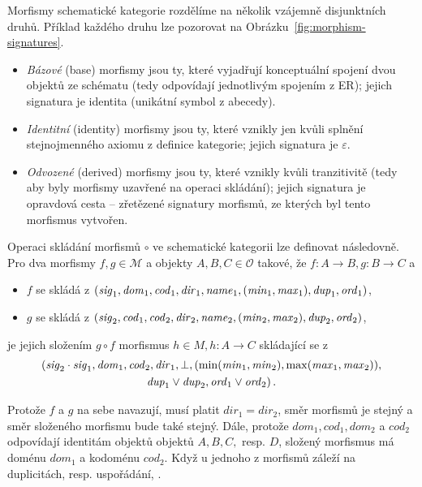 Morfismy schematické kategorie rozdělíme na několik vzájemně disjunktních druhů.
Příklad každého druhu lze pozorovat na Obrázku~\ref{fig:morphism-signatures}.
\begin{itemize}
  \item \emph{Bázové} (base) morfismy jsou ty, které vyjadřují konceptuální spojení dvou objektů ze schématu (tedy odpovídají jednotlivým spojením z ER); jejich signatura je identita (unikátní symbol z abecedy).
  \item \emph{Identitní} (identity) morfismy jsou ty, které vznikly jen kvůli splnění stejnojmenného axiomu z definice kategorie; jejich signatura je $\varepsilon$.
  \item \emph{Odvozené} (derived) morfismy jsou ty, které vznikly kvůli tranzitivitě (tedy aby byly morfismy uzavřené na operaci skládání); jejich signatura je opravdová cesta -- zřetězené signatury morfismů, ze kterých byl tento morfismus vytvořen.
\end{itemize}

Operaci skládání morfismů $\circ$ ve schematické kategorii lze definovat následovně.
Pro dva morfismy $f,g\in\mathcal M$ a objekty $A,B,C\in \mathcal O$ takové, že $f\colon A\to B, g\colon B\to C$ a
\begin{itemize}
  \item $f$ se skládá z $(\mathit{sig}_1, \mathit{dom}_1, \mathit{cod}_1, \mathit{dir}_1, \mathit{name}_1, (\mathit{min}_1, \mathit{max}_1), \mathit{dup}_1, \mathit{ord}_1)$,
  \item $g$ se skládá z $(\mathit{sig}_2, \mathit{cod}_1, \mathit{cod}_2, \mathit{dir}_2, \mathit{name}_2, (\mathit{min}_2, \mathit{max}_2), \mathit{dup}_2, \mathit{ord}_2)$,
\end{itemize}
je jejich složením $g\circ f$ morfismus $h\in M, h\colon A\to C$ skládající se z
\begin{multline*}
  (\mathit{sig}_2\cdot \mathit{sig}_1, \mathit{dom}_1, \mathit{cod}_2, \mathit{dir}_1, \bot, (\min(\mathit{min}_1, \mathit{min}_2), \max(\mathit{max}_1, \mathit{max}_2)),\\ 
  \mathit{dup}_1 \lor \mathit{dup}_2, \mathit{ord}_1\lor \mathit{ord}_2)\,.
\end{multline*}

Protože $f$ a $g$ na sebe navazují, musí platit $dir_1=dir_2$, směr morfismů je stejný a směr složeného morfismu bude také stejný.
Dále, protože $dom_1, cod_1, dom_2$ a $cod_2$ odpovídají identitám objektů objektů $A, B, C,$ resp. $D$, složený morfismus má doménu $dom_1$ a kodoménu $cod_2$.
Když u jednoho z morfismů záleží na duplicitách, resp. uspořádání, .

